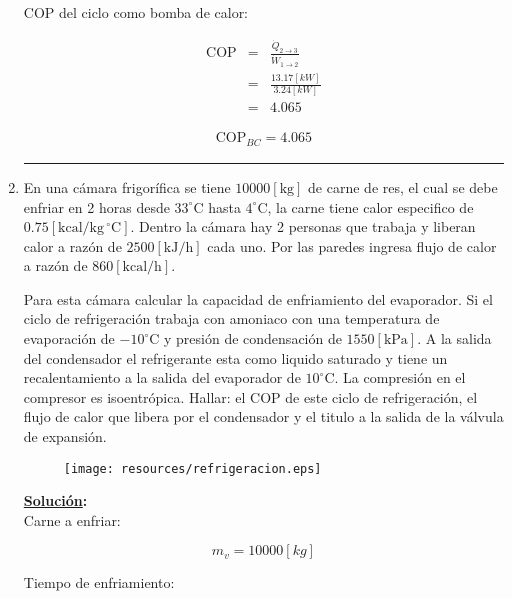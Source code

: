 \documentclass[letter,10pt]{article}
\begin{document}
\begin{enumerate}
COP del ciclo como bomba de calor:

\begin{eqnarray*}
    \text{COP} &=& \frac{\dot{Q}_{2\rightarrow3}}{\dot{W}_{1\rightarrow2}} \\
               &=& \frac{13.17[kW]}{3.24[kW]} \\
               &=& 4.065
\end{eqnarray*}

\begin{equation*}
\boxed{
    \begin{array}{l}
        \text{COP}_{BC} = 4.065
    \end{array}
}
\end{equation*}

\noindent\rule{15.2cm}{0.4pt}

\item En una cámara frigorífica se tiene $10000[\text{kg}]$ de carne de res, el
cual se debe enfriar en 2 horas desde $33^\circ\text{C}$ hasta
$4^\circ\text{C}$, la carne tiene calor especifico de
$0.75[\text{kcal}/\text{kg}\,^\circ\text{C}]$. Dentro la cámara hay 2 personas
que trabaja y liberan calor a razón de $2500[\text{kJ}/\text{h}]$ cada uno. Por
las paredes ingresa flujo de calor a razón de $860[\text{kcal}/\text{h}]$.

Para esta cámara calcular la capacidad de enfriamiento del evaporador. Si el
ciclo de refrigeración trabaja con amoniaco con una temperatura de evaporación
de $-10^\circ\text{C}$ y presión de condensación de $1550[\text{kPa}]$. A la
salida del condensador el refrigerante esta como liquido saturado y tiene un
recalentamiento a la salida del evaporador de $10^\circ\text{C}$. La compresión
en el compresor es isoentrópica. Hallar: el COP de este ciclo de refrigeración,
el flujo de calor que libera por el condensador y el titulo a la salida de la
válvula de expansión.

\begin{figure}[H]
\centering
\texttt{[image: resources/refrigeracion.eps]}
\end{figure}

\textbf{\underline{Solución}:} \\

Carne a enfriar:

\begin{equation*}
    m_v = 10000[kg]
\end{equation*}

Tiempo de enfriamiento:


\end{enumerate}
\end{document}
